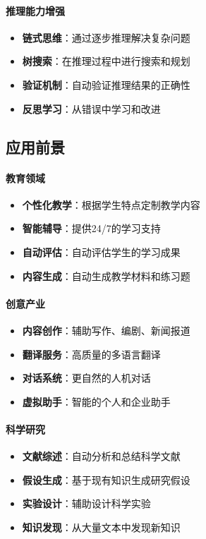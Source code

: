 \paragraph{推理能力增强}
\begin{itemize}
\item \textbf{链式思维}：通过逐步推理解决复杂问题
\item \textbf{树搜索}：在推理过程中进行搜索和规划
\item \textbf{验证机制}：自动验证推理结果的正确性
\item \textbf{反思学习}：从错误中学习和改进
\end{itemize}

\subsection{应用前景}

\paragraph{教育领域}
\begin{itemize}
\item \textbf{个性化教学}：根据学生特点定制教学内容
\item \textbf{智能辅导}：提供24/7的学习支持
\item \textbf{自动评估}：自动评估学生的学习成果
\item \textbf{内容生成}：自动生成教学材料和练习题
\end{itemize}

\paragraph{创意产业}
\begin{itemize}
\item \textbf{内容创作}：辅助写作、编剧、新闻报道
\item \textbf{翻译服务}：高质量的多语言翻译
\item \textbf{对话系统}：更自然的人机对话
\item \textbf{虚拟助手}：智能的个人和企业助手
\end{itemize}

\paragraph{科学研究}
\begin{itemize}
\item \textbf{文献综述}：自动分析和总结科学文献
\item \textbf{假设生成}：基于现有知识生成研究假设
\item \textbf{实验设计}：辅助设计科学实验
\item \textbf{知识发现}：从大量文本中发现新知识
\end{itemize}

